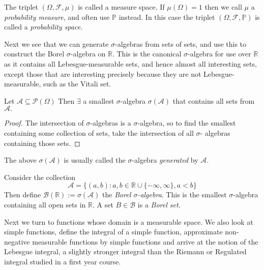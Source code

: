\begin{remark}
    The triplet $(\Omega,\mathcal{F},\mu)$ is called a measure space. If $\mu(\Omega)
    =1$ then we call $\mu$ a \emph{probability measure}, and often use $\mathbb{P}$ 
    instead. In this case the triplet $(\Omega,\mathcal{F},\mathbb{P})$ is called a 
    \emph{probability space}.
\end{remark}

Next we see that we can generate $\sigma$-algebras from sets of sets, and use 
this to construct the Borel $\sigma$-algebra on $\mathbb{R}$. This is the canonical
$\sigma$-algebra for use over $\mathbb{R}$ as it contains all Lebesgue-measurable 
sets, and hence almost all interesting sets, except those that are interesting 
precisely because they are not Lebesgue-measurable, such as the Vitali set.

\begin{lemma}
    Let $\mathcal{A}\subseteq\mathcal{P}(\Omega)$ Then $\exists$ a smallest $\sigma$-algebra 
    $\sigma(\mathcal{A})$ that contains all sets from $\mathcal{A}.$
\end{lemma}
\begin{proof}
    The intersection of $\sigma$-algebras is a $\sigma$-algebra, so to find the 
    smallest containing some collection of sets, take the intersection of all $\sigma$-
    algebras containing those sets.
\end{proof}

\begin{remark}
    The above $\sigma(\mathcal{A})$ is usually called the $\sigma$-algebra
    \emph{generated} by $\mathcal{A}$.
\end{remark}

\begin{definition}
    Consider the collection 
    \begin{equation*}
        \mathcal{A}=\{(a,b):a,b\in\mathbb{R}\cup\{-\infty,\infty\},a<b\}
    \end{equation*}
    Then define $\mathcal{B}(\mathbb{R}):=\sigma(\mathcal{A})$ the \emph{Borel 
    $\sigma$-algebra}. This is the smallest $\sigma$-algebra containing all open
    sets in $\mathbb{R}$. A set $B\in\mathcal{B}$ is a \emph{Borel set}.
\end{definition}

Next we turn to functions whose domain is a measurable space. We also look at simple 
functions, define the integral of a simple function, approximate non-negative measurable
functions by simple functions and arrive at the notion of the Lebesgue integral, a slightly
stronger integral than the Riemann or Regulated integral studied in a first year course.

